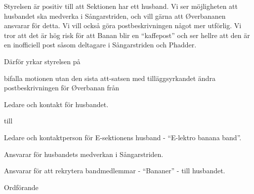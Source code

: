 \documentclass[../_main/handlingar.tex]{subfiles}
\begin{document}
\motionssvar

Styrelsen är positiv till att Sektionen har ett husband. Vi ser möjligheten att husbandet ska medverka i Sångarstriden, och vill gärna att Øverbananen ansvarar för detta. Vi vill också göra postbeskrivningen något mer utförlig. Vi tror att det är hög risk för att Banan blir en ``kaffepost'' och ser hellre att den är en inofficiell post såsom deltagare i Sångarstriden och Phadder.

Därför yrkar styrelsen på
\begin{attsatser}
    \att bifalla motionen utan den sista att-satsen med tilläggsyrkandet
    \att ändra postbeskrivningen för Øverbanan från\par
        \begin{itemizedash}
            \item Ledare och kontakt för husbandet.
        \end{itemizedash}
    till
        \begin{itemizedash}
            \item Ledare och kontaktperson för E-sektionens husband - ``E-lektro banana band''.
            \item Ansvarar för husbandets medverkan i Sångarstriden.
            \item Ansvarar för att rekrytera bandmedlemmar - ``Bananer'' - till husbandet.
        \end{itemizedash}
\end{attsatser}

\begin{signatures}{1}
    \ist
    \signature{Erik Månsson}{Ordförande}
\end{signatures}
\end{document}
